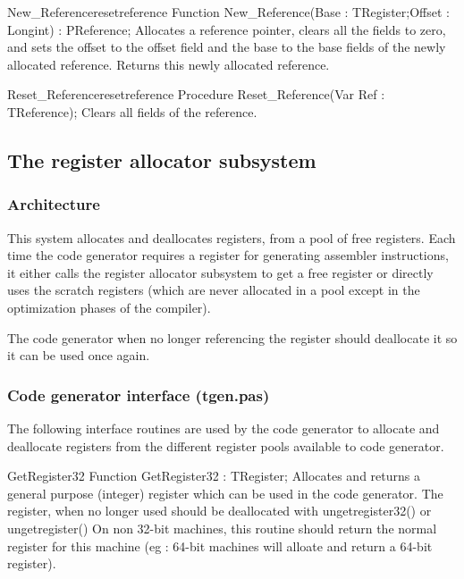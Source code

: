 \documentclass [a4paper,12pt]{article}
\begin{document}
\begin{functionl}{New{\_}Reference}{resetreference}
\Declaration
Function New{\_}Reference(Base : TRegister;Offset : Longint) : PReference;
\Description
Allocates a reference pointer, clears all the fields to zero, and sets the
offset to the offset field and the base to the base fields of the newly
allocated reference. Returns this newly allocated reference.
\end{functionl}

\begin{procedurel}{Reset{\_}Reference}{resetreference}
\Declaration
Procedure Reset{\_}Reference(Var Ref : TReference);
\Description
Clears all fields of the reference.
\end{procedurel}

\subsection{The register allocator subsystem}
\label{subsec:mylabel7}

\subsubsection{Architecture}
\label{subsubsec:architecture}

This system allocates and deallocates registers, from a pool of free
registers. Each time the code generator requires a register for generating
assembler instructions, it either calls the register allocator subsystem to
get a free register or directly uses the scratch registers (which are never
allocated in a pool except in the optimization phases of the compiler).

The code generator when no longer referencing the register should deallocate
it so it can be used once again.

\subsubsection{Code generator interface (tgen.pas)}
\label{subsubsec:mylabel29}

The following interface routines are used by the code generator to allocate
and deallocate registers from the different register pools available to code
generator.

\begin{function}{GetRegister32}
\Declaration
Function GetRegister32 : TRegister;
\Description
Allocates and returns a general purpose (integer) register which can be used
in the code generator. The register, when no longer used should be
deallocated with ungetregister32() or ungetregister()
\Notes
On non 32-bit machines, this routine should return the normal register for
this machine (eg : 64-bit machines will alloate and return a 64-bit
register).
\end{function}
\end{document}
